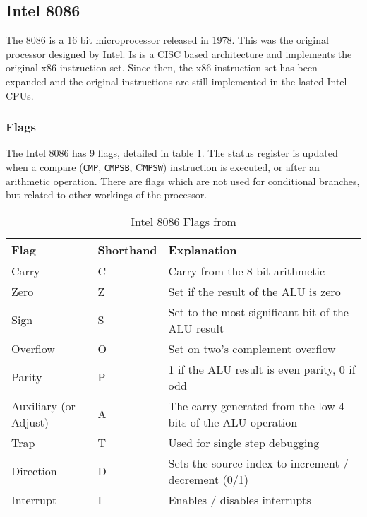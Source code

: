 \documentclass[12pt,a4paper]{article}
\begin{document}
\begin{bibunit}[is-unsrt]
\subsection{Intel 8086}

The 8086 is a 16 bit microprocessor released in 1978.
This was the original processor designed by Intel.
Is is a CISC based architecture and implements the original x86 instruction set.
Since then, the x86 instruction set has been expanded and the original instructions are still implemented in the lasted Intel CPUs.

\subsubsection{Flags}

The Intel 8086 has 9 flags, detailed in table \ref{tab:Intel:flags}.
The status register is updated when a compare (\texttt{CMP}, \texttt{CMPSB}, C\texttt{MPSW}) instruction is executed, or after an arithmetic operation.
There are flags which are not used for conditional branches, but related to other workings of the processor.

\begin{table}
\centering
\caption{Intel 8086 Flags from \cite{Intel:flags}}
\label{tab:Intel:flags}
\begin{tabular}{p{}p{}p{}}\hline
Flag & Shorthand & Explanation \\ \hline
Carry & C & Carry from the 8 bit arithmetic \\
Zero & Z & Set if the result of the ALU is zero \\
Sign & S & Set to the most significant bit of the ALU result \\
Overflow & O & Set on two's complement overflow \\
Parity & P & 1 if the ALU result is even parity, 0 if odd \cite{flag:p} \\
Auxiliary (or Adjust) & A & The carry generated from the low 4 bits of the ALU operation \cite{flag:a}\\
Trap & T & Used for single step debugging \cite{flag:t} \\
Direction & D & Sets the source index to increment / decrement (0/1) \cite{flag:d} \\
Interrupt & I & Enables / disables interrupts \cite{flag:i} \\
\end{tabular}
\end{table}


\end{bibunit}
\end{document}
